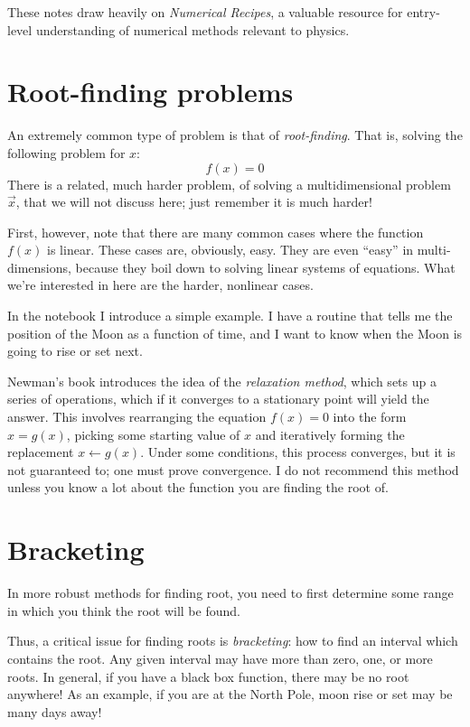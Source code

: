 These notes draw heavily on {\it Numerical Recipes}, a valuable
resource for entry-level understanding of numerical methods relevant
to physics.

\section{Root-finding problems}

An extremely common type of problem is that of {\it
  root-finding}. That is, solving the following problem for $x$:
\begin{equation}
f(x) = 0
\end{equation}
There is a related, much harder problem, of solving a multidimensional
problem $\vec{x}$, that we will not discuss here; just remember it is
much harder!

First, however, note that there are many common cases where the
function $f(x)$ is linear. These cases are, obviously, easy. They are
even ``easy'' in multi-dimensions, because they boil down to solving
linear systems of equations. What we're interested in here are the
harder, nonlinear cases.

In the notebook I introduce a simple example. I have a routine that
tells me the position of the Moon as a function of time, and I want to
know when the Moon is going to rise or set next.

Newman's book introduces the idea of the {\it relaxation method},
which sets up a series of operations, which if it converges to a
stationary point will yield the answer. This involves rearranging the
equation $f(x)=0$ into the form $x=g(x)$, picking some starting value
of $x$ and iteratively forming the replacement $x\leftarrow
g(x)$. Under some conditions, this process converges, but it is not
guaranteed to; one must prove convergence. I do not recommend this
method unless you know a lot about the function you are finding the
root of.

\section{Bracketing}

In more robust methods for finding root, you need to first determine
some range in which you think the root will be found.

Thus, a critical issue for finding roots is {\it bracketing}: how to
find an interval which contains the root. Any given interval may have
more than zero, one, or more roots. In general, if you have a black
box function, there may be no root anywhere! As an example, if you are
at the North Pole, moon rise or set may be many days away!

